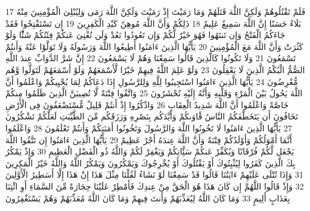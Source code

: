 \documentclass[20pt,a4paper]{article}
\begin{document}
{\tiny\colorbox{cl_aya}{17}} فَلَمْ تَقْتُلُوهُمْ وَلَكِنَّ اللَّهَ قَتَلَهُمْ وَمَا رَمَيْتَ إِذْ رَمَيْتَ وَلَكِنَّ اللَّهَ رَمَى وَلِيُبْلِىَ الْمُؤْمِنِينَ مِنْهُ بَلَاءً حَسَنًا إِنَّ اللَّهَ سَمِيعٌ عَلِيمٌ
{\tiny\colorbox{cl_aya}{18}} ذَلِكُمْ وَأَنَّ اللَّهَ مُوهِنُ كَيْدِ الْكَفِرِينَ
{\tiny\colorbox{cl_aya}{19}} إِن تَسْتَفْتِحُوا فَقَدْ جَاءَكُمُ الْفَتْحُ وَإِن تَنتَهُوا فَهُوَ خَيْرٌ لَّكُمْ وَإِن تَعُودُوا نَعُدْ وَلَن تُغْنِىَ عَنكُمْ فِئَتُكُمْ شَئًْا وَلَوْ كَثُرَتْ وَأَنَّ اللَّهَ مَعَ الْمُؤْمِنِينَ
{\tiny\colorbox{cl_aya}{20}} يَأَيُّهَا الَّذِينَ ءَامَنُوا أَطِيعُوا اللَّهَ وَرَسُولَهُ وَلَا تَوَلَّوْا عَنْهُ وَأَنتُمْ تَسْمَعُونَ
{\tiny\colorbox{cl_aya}{21}} وَلَا تَكُونُوا كَالَّذِينَ قَالُوا سَمِعْنَا وَهُمْ لَا يَسْمَعُونَ
{\tiny\colorbox{cl_aya}{22}} إِنَّ شَرَّ الدَّوَابِّ عِندَ اللَّهِ الصُّمُّ الْبُكْمُ الَّذِينَ لَا يَعْقِلُونَ
{\tiny\colorbox{cl_aya}{23}} وَلَوْ عَلِمَ اللَّهُ فِيهِمْ خَيْرًا لَّأَسْمَعَهُمْ وَلَوْ أَسْمَعَهُمْ لَتَوَلَّوا وَّهُم مُّعْرِضُونَ
{\tiny\colorbox{cl_aya}{24}} يَأَيُّهَا الَّذِينَ ءَامَنُوا اسْتَجِيبُوا لِلَّهِ وَلِلرَّسُولِ إِذَا دَعَاكُمْ لِمَا يُحْيِيكُمْ وَاعْلَمُوا أَنَّ اللَّهَ يَحُولُ بَيْنَ الْمَرْءِ وَقَلْبِهِ وَأَنَّهُ إِلَيْهِ تُحْشَرُونَ
{\tiny\colorbox{cl_aya}{25}} وَاتَّقُوا فِتْنَةً لَّا تُصِيبَنَّ الَّذِينَ ظَلَمُوا مِنكُمْ خَاصَّةً وَاعْلَمُوا أَنَّ اللَّهَ شَدِيدُ الْعِقَابِ
{\tiny\colorbox{cl_aya}{26}} وَاذْكُرُوا إِذْ أَنتُمْ قَلِيلٌ مُّسْتَضْعَفُونَ فِى الْأَرْضِ تَخَافُونَ أَن يَتَخَطَّفَكُمُ النَّاسُ فََٔاوَىكُمْ وَأَيَّدَكُم بِنَصْرِهِ وَرَزَقَكُم مِّنَ الطَّيِّبَتِ لَعَلَّكُمْ تَشْكُرُونَ
{\tiny\colorbox{cl_aya}{27}} يَأَيُّهَا الَّذِينَ ءَامَنُوا لَا تَخُونُوا اللَّهَ وَالرَّسُولَ وَتَخُونُوا أَمَنَتِكُمْ وَأَنتُمْ تَعْلَمُونَ
{\tiny\colorbox{cl_aya}{28}} وَاعْلَمُوا أَنَّمَا أَمْوَلُكُمْ وَأَوْلَدُكُمْ فِتْنَةٌ وَأَنَّ اللَّهَ عِندَهُ أَجْرٌ عَظِيمٌ
{\tiny\colorbox{cl_aya}{29}} يَأَيُّهَا الَّذِينَ ءَامَنُوا إِن تَتَّقُوا اللَّهَ يَجْعَل لَّكُمْ فُرْقَانًا وَيُكَفِّرْ عَنكُمْ سَئَِّاتِكُمْ وَيَغْفِرْ لَكُمْ وَاللَّهُ ذُو الْفَضْلِ الْعَظِيمِ
{\tiny\colorbox{cl_aya}{30}} وَإِذْ يَمْكُرُ بِكَ الَّذِينَ كَفَرُوا لِيُثْبِتُوكَ أَوْ يَقْتُلُوكَ أَوْ يُخْرِجُوكَ وَيَمْكُرُونَ وَيَمْكُرُ اللَّهُ وَاللَّهُ خَيْرُ الْمَكِرِينَ
{\tiny\colorbox{cl_aya}{31}} وَإِذَا تُتْلَى عَلَيْهِمْ ءَايَتُنَا قَالُوا قَدْ سَمِعْنَا لَوْ نَشَاءُ لَقُلْنَا مِثْلَ هَذَا إِنْ هَذَا إِلَّا أَسَطِيرُ الْأَوَّلِينَ
{\tiny\colorbox{cl_aya}{32}} وَإِذْ قَالُوا اللَّهُمَّ إِن كَانَ هَذَا هُوَ الْحَقَّ مِنْ عِندِكَ فَأَمْطِرْ عَلَيْنَا حِجَارَةً مِّنَ السَّمَاءِ أَوِ ائْتِنَا بِعَذَابٍ أَلِيمٍ
{\tiny\colorbox{cl_aya}{33}} وَمَا كَانَ اللَّهُ لِيُعَذِّبَهُمْ وَأَنتَ فِيهِمْ وَمَا كَانَ اللَّهُ مُعَذِّبَهُمْ وَهُمْ يَسْتَغْفِرُونَ
\end{document}
